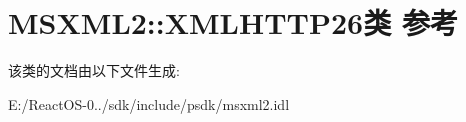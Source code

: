 \hypertarget{class_m_s_x_m_l2_1_1_x_m_l_h_t_t_p26}{}\section{M\+S\+X\+M\+L2\+:\+:X\+M\+L\+H\+T\+T\+P26类 参考}
\label{class_m_s_x_m_l2_1_1_x_m_l_h_t_t_p26}


该类的文档由以下文件生成\+:\begin{DoxyCompactItemize}
\item 
E\+:/\+React\+O\+S-\/0../sdk/include/psdk/msxml2.\+idl\end{DoxyCompactItemize}
